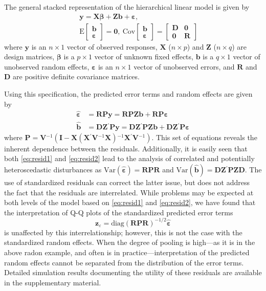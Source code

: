 \documentclass[12pt]{article} %
\newcommand{\inv}{\ensuremath{^{-1}}}
\newcommand{\trans}{\ensuremath{^\prime}}
\newcommand{\E}{\ensuremath{\mathrm{E}}}
\newcommand{\var}{\ensuremath{\mathrm{Var}}}
\newcommand{\cov}{\ensuremath{\mathrm{Cov}}}
\begin{document}
The general stacked representation of the hierarchical linear model is given by
%
\begin{eqnarray}\label{eq:hlm}
 && \bm{y} = \bm{X \beta} + \bm{Z b} + \bm{\varepsilon}, \\ \nonumber
 && \E \begin{bmatrix} \bm{b} \\ \bm{\varepsilon} \end{bmatrix} = \bm{0}, 
 \ \cov \begin{bmatrix} \bm{b} \\ \bm{\varepsilon} \end{bmatrix} = 
  	\begin{bmatrix} \bm{D} & \bm{0}\\ \bm{0} & \bm{R} \end{bmatrix}
\end{eqnarray}
%
where $\bm{y}$ is an $n \times 1$ vector of observed responses, $\bm{X}$ ($n \times p$) and $\bm{Z}$ ($n \times q$) are design matrices, $\bm{\beta}$ is a $p \times 1$ vector of unknown fixed effects, $\bm{b}$ is a $q \times 1$ vector of unobserved random effects, $\bm{\varepsilon}$ is an $n \times 1$ vector of unobserved errors, and $\bm{R}$ and $\bm{D}$ are positive definite covariance matrices.

Using this specification, the predicted error terms and random effects are given by 
%
\begin{align}
\widehat{\bm{\varepsilon}} &= \bm{RPy} = \bm{RPZb} + \bm{RP \varepsilon} \label{eq:resid1}\\
\widehat{\bm{b}} &= \bm{DZ}\trans \bm{Py} = \bm{DZ}\trans \bm{PZb} + \bm{DZ}\trans \bm{P \varepsilon} \label{eq:resid2}
\end{align}
%
where $\bm{P} = \bm{V}\inv( \bm{I} - \bm{X} (\bm{X}\trans \bm{V}\inv \bm{X})\inv \bm{X}\trans \bm{V}\inv)$. This  set of equations %
reveals the inherent dependence between the residuals.
Additionally, it is easily seen that both \eqref{eq:resid1} and \eqref{eq:resid2} lead to the analysis of correlated and potentially heteroscedastic disturbances as $\var(\widehat{\bm{\varepsilon}}) = \bm{RPR}$ and $\var(\widehat{\bm{b}}) = \bm{DZ}\trans \bm{PZD}$.
The use of standardized residuals can correct the latter issue, but does not address the fact that the residuals are interrelated. While problems may be expected at both levels of the model based on \eqref{eq:resid1} and \eqref{eq:resid2}, we have found that the interpretation of Q-Q plots of the standardized predicted error terms
%
\[
\bm{z}_{\varepsilon} =  \text{diag} \left(\bm{RPR} \right)^{-1/2} \widehat{\bm{\varepsilon}}
\]
%
is unaffected by this interrelationship; however, this is not the case with the standardized random effects.  When the degree of pooling is high---as it is in the above radon example, and often is in practice---interpretation of the predicted random effects cannot be separated from the distribution of the error terms. Detailed simulation results documenting the utility of  these residuals are available in the supplementary material.
\end{document}

